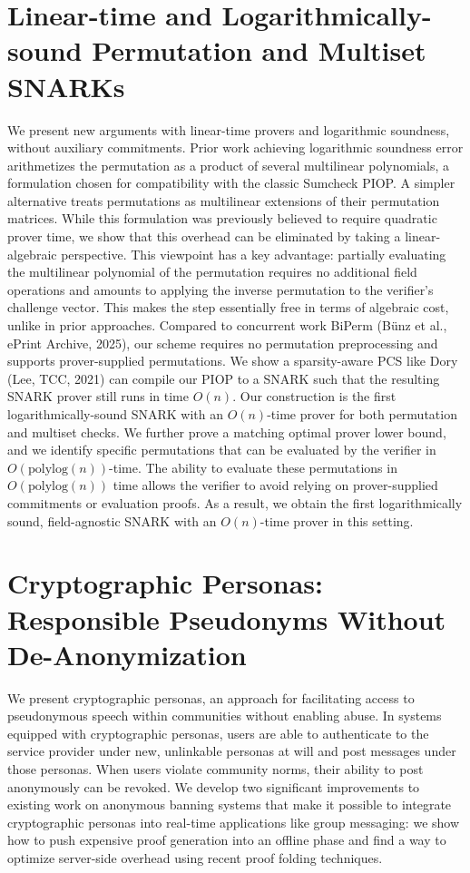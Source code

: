 \documentclass[11pt,oneside]{book}
\theoremstyle{definition}
\theoremstyle{remark}
\theoremstyle{plain}
\begin{document}
\section{\cite{cryptoeprint:2025/1967} Linear-time and Logarithmically-sound Permutation and Multiset SNARKs}
We present new arguments with linear-time provers and logarithmic soundness, without auxiliary commitments. Prior work achieving logarithmic soundness error arithmetizes the permutation as a product of several multilinear polynomials, a formulation chosen for compatibility with the classic Sumcheck PIOP. A simpler alternative treats permutations as multilinear extensions of their permutation matrices. While this formulation was previously believed to require quadratic prover time, we show that this overhead can be eliminated by taking a linear-algebraic perspective. This viewpoint has a key advantage: partially evaluating the multilinear polynomial of the permutation requires no additional field operations and amounts to applying the inverse permutation to the verifier's challenge vector. This makes the step essentially free in terms of algebraic cost, unlike in prior approaches. Compared to concurrent work BiPerm (Bünz et al., ePrint Archive, 2025), our scheme requires no permutation preprocessing and supports prover-supplied permutations. We show a sparsity-aware PCS like Dory (Lee, TCC, 2021) can compile our PIOP to a SNARK such that the resulting SNARK prover still runs in time $O(n)$. Our construction is the first logarithmically-sound SNARK with an $O(n)$-time prover for both permutation and multiset checks. We further prove a matching optimal prover lower bound, and we identify specific permutations that can be evaluated by the verifier in $O(\mathrm{polylog}(n))$-time. The ability to evaluate these permutations in $O(\mathrm{polylog}(n))$ time allows the verifier to avoid relying on prover-supplied commitments or evaluation proofs. As a result, we obtain the first logarithmically sound, field-agnostic SNARK with an $O(n)$-time prover in this setting.

\section{\cite{cryptoeprint:2025/1969}Cryptographic Personas: Responsible Pseudonyms Without De-Anonymization}
We present cryptographic personas, an approach for facilitating access to pseudonymous speech within communities without enabling abuse.  In systems equipped with cryptographic personas, users are able to authenticate to the service provider under new, unlinkable personas at will and post messages under those personas. When users violate community norms, their ability to post anonymously can be revoked.  We develop two significant improvements to existing work on anonymous banning systems that make it possible to integrate cryptographic personas into real-time applications like group messaging: we show how to push expensive proof generation into an offline phase and find a way to optimize server-side overhead using recent proof folding techniques. 
\end{document}
